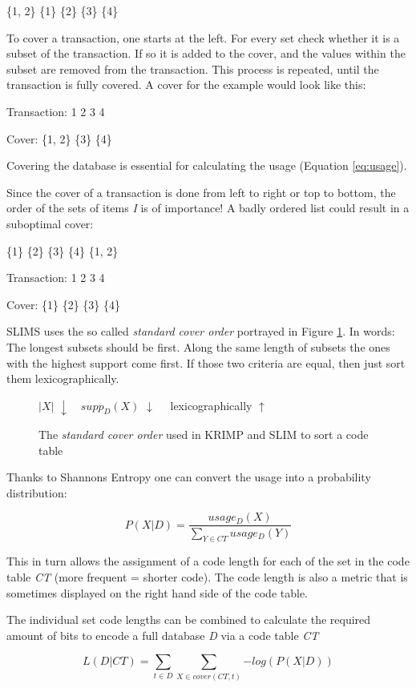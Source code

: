 \documentclass[runningheads]{llncs}
\begin{document}
\centerline{\{1, 2\} \{1\} \{2\} \{3\} \{4\}}

To cover a transaction, one starts at the left. For every set check whether it is a subset of the transaction. If so it is added to the cover, and the values within the subset are removed from the transaction. This process is repeated, until the transaction is fully covered. A cover for the example would look like this:

\centerline{Transaction: 1 2 3 4}
\centerline{Cover: \{1, 2\} \{3\} \{4\}}

Covering the database is essential for calculating the usage (Equation \ref{eq:usage}).

Since the cover of a transaction is done from left to right or top to bottom, the order of the sets of items \emph{I} is of importance!
A badly ordered list could result in a suboptimal cover:

\centerline{\{1\} \{2\} \{3\} \{4\}  \{1, 2\}}
\centerline{Transaction: 1 2 3 4}
\centerline{Cover: \{1\} \{2\} \{3\} \{4\}}
 
SLIMS uses the so called \emph{standard cover order} portrayed in Figure \ref{fig:sco}.
In words: The longest subsets should be first. Along the same length of subsets the ones with the highest support come first. If those two criteria are equal, then just sort them lexicographically.
\begin{figure}
\centerline{$|X|$ $\downarrow \quad supp_D(X)$ $\downarrow\quad$  lexicographically $\uparrow$ }
\caption{The \emph{standard cover order} used in KRIMP and SLIM to sort a code table}
\label{fig:sco}
\end{figure}

Thanks to Shannons Entropy one can convert the usage into a probability distribution:

\begin{equation}
\label{eq:probab}
P(X|D) = \frac{usage_D(X)}{\sum_{Y\in CT}usage_D(Y)}
\end{equation}

This in turn allows the assignment of a code length for each of the set in the code table \emph{CT} (more frequent = shorter code). The code length is also a metric that is sometimes displayed on the right hand side of the code table.

The individual set code lengths can be combined to calculate the required amount of bits to encode a full database \emph{D} via a code table \emph{CT}

\begin{equation}
\label{eq:codeLength}
L(D | CT) = \sum_{t\in D}{\sum_{X\in cover(CT, t)}{-log(P(X | D))}}
\end{equation}
\end{document}
